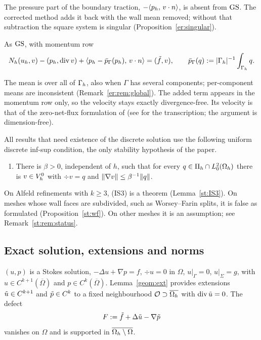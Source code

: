The pressure part of the boundary traction, $-\langle p_h,\, v\cdot n\rangle$, is absent from $\mathrm{GS}$. The corrected method adds it back with the wall mean removed; without that subtraction the square system is singular (Proposition~\ref{er:singular}).

\begin{definition}\label{set:CNS}
As $\mathrm{GS}$, with momentum row
\[
N_h(u_h,v)-(p_h,\operatorname{div} v)+\langle p_h-\bar p_{\Gamma}(p_h),\, v\cdot n\rangle=(\tilde f,v),\qquad \bar p_{\Gamma}(q):=|\Gamma_h|^{-1}\int_{\Gamma_h}q .
\]
\end{definition}
The mean is over all of $\Gamma_h$, also when $\Gamma$ has several components; per-component means are inconsistent (Remark~\ref{er:rem:global}). The added term appears in the momentum row only, so the velocity stays exactly divergence-free. Its velocity is that of the zero-net-flux formulation of \cite[Section~5.1]{FrachonNilssonZahedi2024} (see \cite{PadhiLong2D} for the transcription; the argument is dimension-free).

All results that need existence of the discrete solution use the following uniform discrete inf-sup condition, the only stability hypothesis of the paper.
\begin{enumerate}[label=(IS3)]
\item There is $\beta>0$, independent of $h$, such that for every $q\in\Pi_h\cap L^2_0(\Omega_h)$ there is $v\in V_h^0$ with $\div v=q$ and $\lVert \nabla v\rVert\le\beta^{-1}\lVert q\rVert$.
\end{enumerate}
On Alfeld refinements with $k\ge3$, (IS3) is a theorem (Lemma~\ref{st:IS3}). On meshes whose wall faces are subdivided, such as Worsey--Farin splits, it is false as formulated (Proposition~\ref{st:wf}). On other meshes it is an assumption; see Remark~\ref{st:rem:status}.

\subsection{Exact solution, extensions and norms}
$(u,p)$ is a Stokes solution, $-\Delta u+\nabla p=f$, $\div u=0$ in $\Omega$, $u|_\Gamma=0$, $u|_\Sigma=g$, with $u\in C^{k+1}(\overline\Omega)$ and $p\in C^k(\overline\Omega)$. Lemma~\ref{geom:ext} provides extensions $\tilde u\in C^{k+1}$ and $\tilde p\in C^k$ to a fixed neighbourhood $\mathcal O\supset\overline{\Omega_h}$ with $\operatorname{div}\tilde u=0$. The defect
\[
F:=\tilde f+\Delta\tilde u-\nabla\tilde p
\]
vanishes on $\Omega$ and is supported in $\overline{\Omega_h\setminus\Omega}$.


